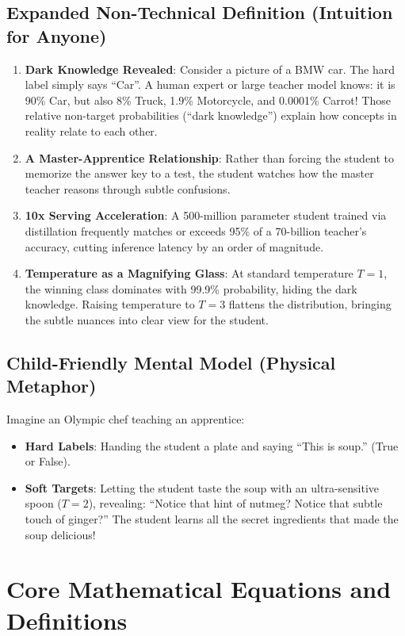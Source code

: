 \documentclass[11pt,a4paper]{article}
\theoremstyle{definition}
\begin{document}
\subsection{Expanded Non-Technical Definition (Intuition for Anyone)}
\begin{enumerate}
    \item \textbf{Dark Knowledge Revealed}: Consider a picture of a BMW car. The hard label simply says ``Car''. A human expert or large teacher model knows: it is 90\% Car, but also 8\% Truck, 1.9\% Motorcycle, and 0.0001\% Carrot! Those relative non-target probabilities (``dark knowledge'') explain how concepts in reality relate to each other.
    \item \textbf{A Master-Apprentice Relationship}: Rather than forcing the student to memorize the answer key to a test, the student watches how the master teacher reasons through subtle confusions.
    \item \textbf{10x Serving Acceleration}: A 500-million parameter student trained via distillation frequently matches or exceeds 95\% of a 70-billion teacher's accuracy, cutting inference latency by an order of magnitude.
    \item \textbf{Temperature as a Magnifying Glass}: At standard temperature $T=1$, the winning class dominates with 99.9\% probability, hiding the dark knowledge. Raising temperature to $T=3$ flattens the distribution, bringing the subtle nuances into clear view for the student.
\end{enumerate}

\subsection{Child-Friendly Mental Model (Physical Metaphor)}
Imagine an Olympic chef teaching an apprentice:
\begin{itemize}
    \item \textbf{Hard Labels}: Handing the student a plate and saying ``This is soup.'' (True or False).
    \item \textbf{Soft Targets}: Letting the student taste the soup with an ultra-sensitive spoon ($T=2$), revealing: ``Notice that hint of nutmeg? Notice that subtle touch of ginger?'' The student learns all the secret ingredients that made the soup delicious!
\end{itemize}

\section{Core Mathematical Equations and Definitions}
\end{document}
